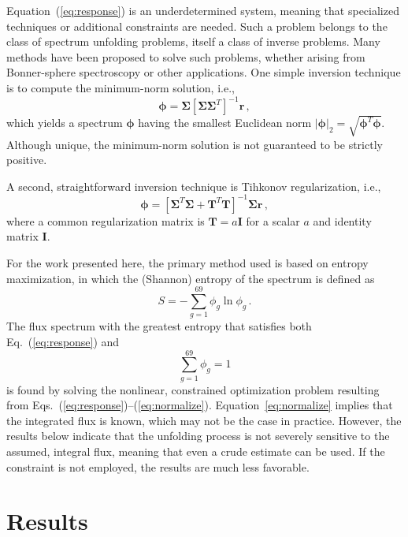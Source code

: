 \documentclass[journal]{IEEEtran}
\newcommand{\EQ}[1]{Eq.~(\ref{#1})}               %
\newcommand{\EQUATION}[1]{Equation~(\ref{#1})}    %
\begin{document}
\EQUATION{eq:response} is an underdetermined system, meaning that specialized techniques or additional constraints are needed.  Such a problem belongs to the class of  spectrum unfolding problems, itself a class of inverse problems.  Many methods have been proposed to solve such problems, whether arising from Bonner-sphere spectroscopy or other applications.  One simple inversion technique is to compute the minimum-norm solution, i.e.,
\begin{equation}
  \bm{\phi} =  \bm{\Sigma}  [\bm{\Sigma} \bm{\Sigma}^T]^{-1}\mathbf{r} \, ,
\end{equation}
which yields a spectrum $\bm{\phi}$ having the smallest Euclidean norm $|\bm{\phi}|_2 = \sqrt{\bm{\phi}^T\bm{\phi}}$.  Although unique, the minimum-norm solution is not guaranteed to be strictly positive.  

A second, straightforward inversion technique is Tihkonov regularization, i.e.,
\begin{equation}
 \bm{\phi} = [\bm{\Sigma}^T \bm{\Sigma}+ \mathbf{T}^T \mathbf{T}]^{-1} \bm{\Sigma} \mathbf{r} \, ,
\end{equation}
where a common regularization matrix is $\mathbf{T} = a\mathbf{I}$ for a scalar $a$ and identity matrix $\mathbf{I}$.  

For the work presented here, the primary method used is based on entropy maximization\cite{itoh1989neutron}, in which the (Shannon) entropy of the spectrum is defined as
\begin{equation}
 S = -\sum^{69}_{g=1} \phi_g \ln \phi_g \, .
\label{eq:entropy}
\end{equation}
The flux spectrum with the greatest entropy that satisfies both \EQ{eq:response} and
\begin{equation}
 \sum^{69}_{g=1} \phi_g = 1
\label{eq:normalize}
\end{equation}
is found by solving the nonlinear, constrained optimization problem resulting from Eqs.~(\ref{eq:response})--(\ref{eq:normalize}).  Equation~\ref{eq:normalize} implies that the integrated flux is known, which may not be the case in practice.  However, the results below indicate that the unfolding process is not severely sensitive to the assumed, integral flux, meaning that even a crude estimate can be used.  If the constraint is not employed, the results are much less favorable.


\section{Results}
\end{document}
